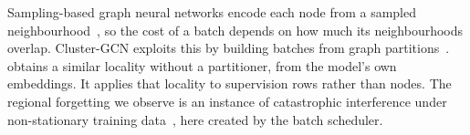  Sampling-based graph neural networks encode each node from a sampled
neighbourhood~\cite{hamilton2017inductive,ying2018graph}, so the cost of a batch depends on how much its neighbourhoods
overlap. Cluster-GCN exploits this by building batches from graph partitions~\cite{chiang2019clustergcn}.
\ours{} obtains a similar locality without a partitioner, from the model's own embeddings. It applies
that locality to supervision rows rather than nodes. The regional forgetting we observe is an instance of catastrophic
interference under non-stationary training data~\cite{mccloskey1989catastrophic}, here created by the batch scheduler.
